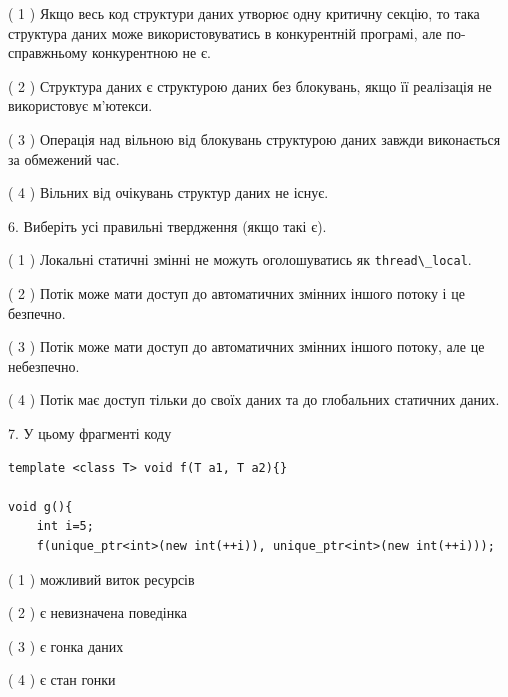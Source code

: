 \documentclass[12pt, ukrainian]{article}
\def\code#1{\Verb!#1!}
\begin{document}
\begin {large}
{( 1 ) Якщо весь код структури даних утворює одну критичну секцію, то така структура даних може використовуватись в конкурентній програмі, але по-справжньо\-му конкурентною не є.%

( 2 ) Структура даних є структурою даних без блокувань, якщо її реалізація не використовує м’ютекси.%

( 3 ) Операція над вільною від блокувань структурою даних завжди виконається за обмежений час.%

( 4 ) Вільних від очікувань структур даних не існує.%
\newpage



\vspace{5mm}
6. Виберіть усі правильні твердження (якщо такі є).\par
\vspace{2mm}

( 1 ) Локальні статичні змінні не можуть оголошуватись як \code{thread\_local}.%

( 2 ) Потік може мати доступ до автоматичних змінних іншого потоку і це безпечно.%

( 3 ) Потік може мати доступ до автоматичних змінних іншого потоку, але це небезпечно.%

( 4 ) Потік має доступ тільки до своїх даних та до глобальних статичних даних.%


\vspace{5mm}
7. У цьому фрагменті коду
\begin{verbatim}
template <class T> void f(T a1, T a2){}

void g(){
    int i=5;
    f(unique_ptr<int>(new int(++i)), unique_ptr<int>(new int(++i)));
\end{verbatim}

( 1 ) можливий виток ресурсів%

( 2 ) є невизначена поведінка%

( 3 ) є гонка даних%

( 4 ) є стан гонки%
}
\end {large}
\end{document}
